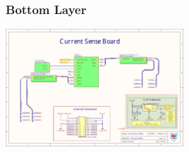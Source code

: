 \subsubsection{Bottom Layer}
\begin{center}
	\includegraphics[page=7,width=0.5\textwidth,angle=90,origin=c]{./Appendix/Job2.pdf}
\end{center}